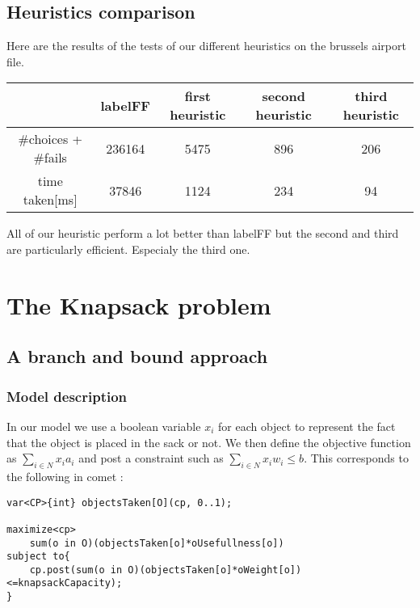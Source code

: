 \documentclass{eplDoc}
\begin{document}
\subsection{Heuristics comparison} %
Here are the results of the tests of our different heuristics on the brussels airport file. 
\begin{table}[h]
	\centering
		\begin{tabular}{|c|cccc|}
			\hline
			  & labelFF & first heuristic & second heuristic & third heuristic \\ 
			  \hline
			\#choices + \#fails &   236164 & 5475 & 896 & 206 \\ 
			time taken[ms] & 37846 & 1124 & 234 & 94 \\ 
			\hline
			
		\end{tabular}
\end{table}

All of our heuristic perform a lot better than labelFF but the second and third are particularly efficient. Especialy the third one.

\section{The Knapsack problem}
\subsection{A branch and bound approach} %

\subsubsection{Model description}
In our model we use a boolean variable $x_i$ for each object to represent the fact that the object is placed in the sack or not. We then define the objective function as  $\sum_{i \in N} x_ia_i$ and post a constraint such as $\sum_{i \in N}x_iw_i \le b$. This corresponds to the following in comet : 
\begin{lstlisting}
var<CP>{int} objectsTaken[O](cp, 0..1);         

maximize<cp>
    sum(o in O)(objectsTaken[o]*oUsefullness[o])
subject to{
    cp.post(sum(o in O)(objectsTaken[o]*oWeight[o])<=knapsackCapacity);
}
\end{lstlisting}
\end{document}
